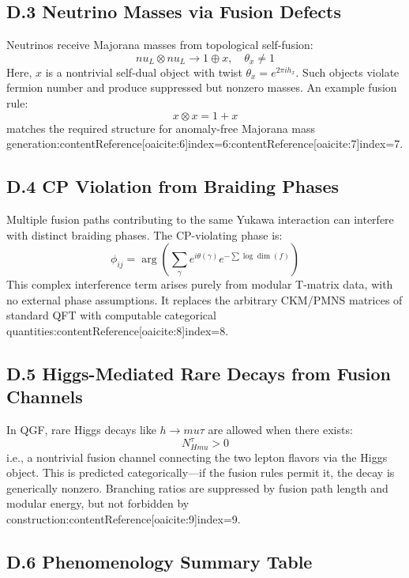 \documentclass[11pt]{article}
\def\mu{mu}
\def\nu{nu}
\def\left{}
\def\right{}
\begin{document}
\subsection*{D.3 Neutrino Masses via Fusion Defects}

Neutrinos receive Majorana masses from topological self-fusion:
\[
\nu_L \otimes \nu_L \to 1 \oplus x, \quad \theta_x \neq 1
\]
Here, \( x \) is a nontrivial self-dual object with twist \( \theta_x = e^{2\pi i h_x} \). Such objects violate fermion number and produce suppressed but nonzero masses. An example fusion rule:
\[
x \otimes x = 1 + x
\]
matches the required structure for anomaly-free Majorana mass generation:contentReference[oaicite:6]{index=6}:contentReference[oaicite:7]{index=7}.

\subsection*{D.4 CP Violation from Braiding Phases}

Multiple fusion paths contributing to the same Yukawa interaction can interfere with distinct braiding phases. The CP-violating phase is:
\[
\phi_{ij} = \arg\left( \sum_{\gamma} e^{i\theta(\gamma)} e^{- \sum \log \dim(f)} \right)
\]
This complex interference term arises purely from modular T-matrix data, with no external phase assumptions. It replaces the arbitrary CKM/PMNS matrices of standard QFT with computable categorical quantities:contentReference[oaicite:8]{index=8}.

\subsection*{D.5 Higgs-Mediated Rare Decays from Fusion Channels}

In QGF, rare Higgs decays like \( h \to \mu \tau \) are allowed when there exists:
\[
N_{H \mu}^{\tau} > 0
\]
i.e., a nontrivial fusion channel connecting the two lepton flavors via the Higgs object. This is predicted categorically—if the fusion rules permit it, the decay is generically nonzero. Branching ratios are suppressed by fusion path length and modular energy, but not forbidden by construction:contentReference[oaicite:9]{index=9}.

\subsection*{D.6 Phenomenology Summary Table}
\end{document}
